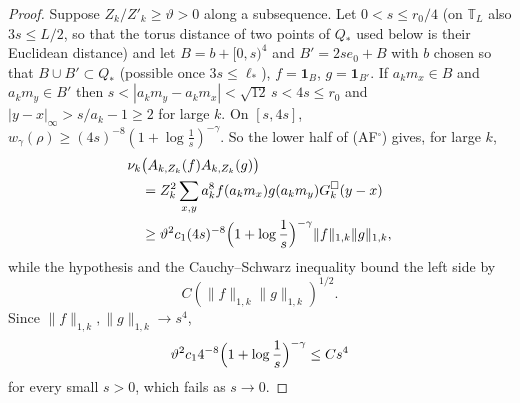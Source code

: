 \begin{proof}
Suppose $Z_k/Z'_k\ge\vartheta>0$ along a subsequence. Let $0<s\le r_0/4$ (on $\mathbb T_L$ also $3s\le L/2$, so that the torus
distance of two points of $Q_*$ used below is their Euclidean distance) and
let $B=b+[0,s)^4$ and $B'=2se_0+B$ with $b$ chosen so that $B\cup B'\subset
Q_*$ (possible once $3s\le\ell_*$), $f=\mathbf 1_B$, $g=\mathbf1_{B'}$. If
$a_km_x\in B$ and $a_km_y\in B'$ then $s<|a_km_y-a_km_x|<\sqrt{12}\,s<4s\le
r_0$ and $|y-x|_\infty>s/a_k-1\ge2$ for large $k$. On $[s,4s]$,
$w_\gamma(\rho)\ge(4s)^{-8}(1+\log\frac1s)^{-\gamma}$. So the lower half of
(AF$^\square$) gives, for large $k$,
\begin{align*}
&\nu_k\bigl(A_{k,Z_k}(f)A_{k,Z_k}(g)\bigr)\\
&\quad=Z_k^2\sum_{x,y}a_k^8f(a_km_x)g(a_km_y)G^\square_k(y-x)\\
&\quad\ge\vartheta^2c_1(4s)^{-8}\Bigl(1+\log\frac1s\Bigr)^{-\gamma}
\|f\|_{1,k}\|g\|_{1,k},
\end{align*}
while the hypothesis and the Cauchy--Schwarz inequality bound the left side
by
\[
C(\|f\|_{1,k}\|g\|_{1,k})^{1/2}.
\]
Since $\|f\|_{1,k},\|g\|_{1,k}\to s^4$,
\[
\vartheta^2c_14^{-8}\Bigl(1+\log\frac1s\Bigr)^{-\gamma}\le Cs^4
\]
for every small $s>0$, which fails as $s\to0$.
\end{proof}

